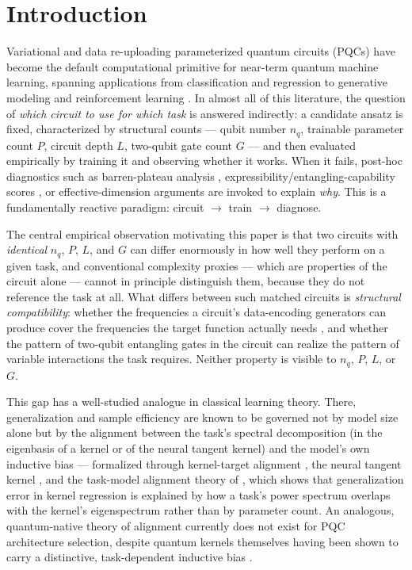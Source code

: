 \documentclass[11pt]{article}
\begin{document}
\section{Introduction}
\label{sec:intro}

Variational and data re-uploading parameterized quantum circuits (PQCs) have become the default computational primitive for near-term quantum machine learning, spanning applications from classification and regression to generative modeling and reinforcement learning \citep{cerezo2021variational}. In almost all of this literature, the question of \emph{which circuit to use for which task} is answered indirectly: a candidate ansatz is fixed, characterized by structural counts --- qubit number $n_q$, trainable parameter count $P$, circuit depth $L$, two-qubit gate count $G$ --- and then evaluated empirically by training it and observing whether it works. When it fails, post-hoc diagnostics such as barren-plateau analysis \citep{mcclean2018barren,larocca2024review}, expressibility/entangling-capability scores \citep{sim2019expressibility}, or effective-dimension arguments \citep{abbas2021power} are invoked to explain \emph{why}. This is a fundamentally reactive paradigm: circuit $\rightarrow$ train $\rightarrow$ diagnose.

The central empirical observation motivating this paper is that two circuits with \emph{identical} $n_q$, $P$, $L$, and $G$ can differ enormously in how well they perform on a given task, and conventional complexity proxies --- which are properties of the circuit alone --- cannot in principle distinguish them, because they do not reference the task at all. What differs between such matched circuits is \emph{structural compatibility}: whether the frequencies a circuit's data-encoding generators can produce cover the frequencies the target function actually needs \citep{schuld2021effect,perezsalinas2020data}, and whether the pattern of two-qubit entangling gates in the circuit can realize the pattern of variable interactions the task requires. Neither property is visible to $n_q$, $P$, $L$, or $G$.

This gap has a well-studied analogue in classical learning theory. There, generalization and sample efficiency are known to be governed not by model size alone but by the alignment between the task's spectral decomposition (in the eigenbasis of a kernel or of the neural tangent kernel) and the model's own inductive bias --- formalized through kernel-target alignment \citep{cristianini2001kernel}, the neural tangent kernel \citep{jacot2018neural}, and the task-model alignment theory of \citet{canatar2021spectral}, which shows that generalization error in kernel regression is explained by how a task's power spectrum overlaps with the kernel's eigenspectrum rather than by parameter count. An analogous, quantum-native theory of alignment currently does not exist for PQC architecture selection, despite quantum kernels themselves having been shown to carry a distinctive, task-dependent inductive bias \citep{kubler2021inductive}.
\end{document}
